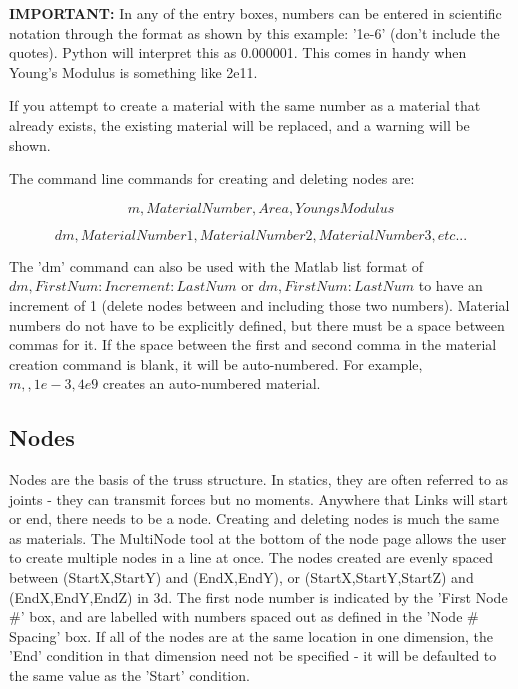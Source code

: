 \documentclass[11pt, oneside]{article}   	%
\begin{document}
\textbf{IMPORTANT:} In any of the entry boxes, numbers can be entered in scientific notation through the format as shown by this example: '1e-6' (don't include the quotes).  Python will interpret this as 0.000001.  This comes in handy when Young's Modulus is something like 2e11.

If you attempt to create a material with the same number as a material that already exists, the existing material will be replaced, and a warning will be shown.

The command line commands for creating and deleting nodes are:

\begin{equation}
m, MaterialNumber, Area, YoungsModulus
\end{equation}

\begin{equation}
dm,MaterialNumber1,MaterialNumber2,MaterialNumber3,etc...
\end{equation}

The 'dm' command can also be used with the Matlab list format of $ dm, FirstNum:Increment:LastNum $ or $ dm, FirstNum:LastNum $ to have an increment of 1 (delete nodes between and including those two numbers).  Material numbers do not have to be explicitly defined, but there must be a space between commas for it.  If the space between the first and second comma in the material creation command is blank, it will be auto-numbered.  For example, $m, , 1e-3,4e9$ creates an auto-numbered material.

\subsection{Nodes}
Nodes are the basis of the truss structure.  In statics, they are often referred to as joints - they can transmit forces but no moments.  Anywhere that Links will start or end, there needs to be a node.  Creating and deleting nodes is much the same as materials.  The MultiNode tool at the bottom of the node page allows the user to create multiple nodes in a line at once.  The nodes created are evenly spaced between (StartX,StartY) and (EndX,EndY), or (StartX,StartY,StartZ) and (EndX,EndY,EndZ) in 3d.  The first node number is indicated by the 'First Node \#' box, and are labelled with numbers spaced out as defined in the 'Node \# Spacing' box.  If all of the nodes are at the same location in one dimension, the 'End' condition in that dimension need not be specified - it will be defaulted to the same value as the 'Start' condition.
\end{document}
